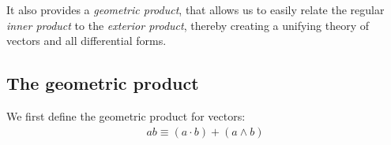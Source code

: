 \documentclass[11pt]{book}
\begin{document}
It also provides a \emph{geometric product}, that allows us to easily relate
the regular \emph{inner product} to the \emph{exterior product}, thereby
creating a unifying theory of vectors and all differential forms.

\subsection{The geometric product}

We first define the geometric product for vectors:
\begin{align*}
    ab \equiv (a \cdot b) + (a \wedge b)
\end{align*}


\subsection{}
\end{document}
